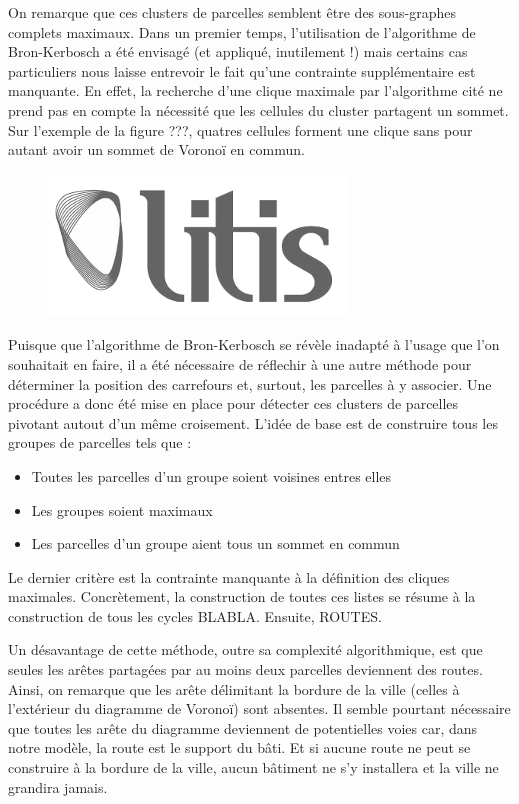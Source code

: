 \documentclass[12pt]{article}
\begin{document}
On remarque que ces clusters de parcelles semblent être des
sous-graphes complets maximaux. Dans un premier temps, l'utilisation
de l'algorithme de Bron-Kerbosch a été envisagé (et appliqué,
inutilement !) mais certains cas particuliers nous laisse entrevoir
le fait qu'une contrainte supplémentaire est manquante. En effet, la
recherche d'une clique maximale par l'algorithme cité ne prend pas en
compte la nécessité que les cellules du cluster partagent un
sommet. Sur l'exemple de la figure ???, quatres cellules forment une
clique sans pour autant avoir un sommet de Voronoï en commun.

\begin{figure}
  \centering
  \includegraphics[width=.6\linewidth]{images/logo-litis.png}
  \caption{}
  \label{fig:construction-viaire2}
\end{figure}

Puisque que l'algorithme de Bron-Kerbosch se révèle inadapté à l'usage
que l'on souhaitait en faire, il a été nécessaire de réflechir à une
autre méthode pour déterminer la position des carrefours et, surtout,
les parcelles à y associer. Une procédure a donc été mise en place
pour détecter ces clusters de parcelles pivotant autout d'un même
croisement. L'idée de base est de construire tous les groupes de
parcelles tels que :

\begin{itemize}
\item{Toutes les parcelles d'un groupe soient voisines entres elles}
\item{Les groupes soient maximaux}
\item{Les parcelles d'un groupe aient tous un sommet en commun}
\end{itemize}

Le dernier critère est la contrainte manquante à la définition des
cliques maximales. Concrètement, la construction de toutes ces listes
se résume à la construction de tous les cycles BLABLA. Ensuite,
ROUTES.

Un désavantage de cette méthode, outre sa complexité algorithmique,
est que seules les arêtes partagées par au moins deux parcelles
deviennent des routes. Ainsi, on remarque que les arête délimitant la
bordure de la ville (celles à l'extérieur du diagramme de Voronoï)
sont absentes. Il semble pourtant nécessaire que toutes les arête du
diagramme deviennent de potentielles voies car, dans notre modèle, la
route est le support du bâti. Et si aucune route ne peut se construire
à la bordure de la ville, aucun bâtiment ne s'y installera et la ville
ne grandira jamais.
\end{document}
